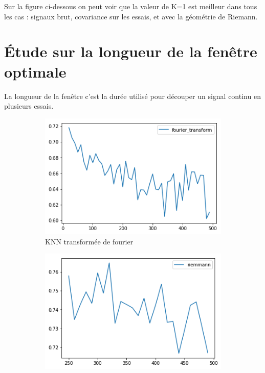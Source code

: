 \documentclass{article}[12pt]
\begin{document}
Sur la figure ci-dessous on peut voir que la valeur de K=1 est meilleur dans tous les cas : signaux brut, covariance sur les essais, et avec la géométrie de Riemann.
\section{Étude sur la longueur de la fenêtre optimale}
La longueur de la fenêtre c'est la durée utilisé pour découper un signal continu en plusieurs essais.
\begin{figure}[h]
        \centering
        \begin{subfigure}[b]{0.475\textwidth}
            \centering
            \includegraphics[width=\textwidth]{images/knn_tf_f1Score.png}
            \caption[Network2]%
            {{\small KNN transformée de fourier}}    
            \label{fig:mean and std of net14}
        \end{subfigure}
        \hfill
        \begin{subfigure}[b]{0.475\textwidth}  
            \centering 
            \includegraphics[width=\textwidth]{images/riemann_cov_knn_f1Score.png}

\end{subfigure}
\end{figure}
\end{document}
